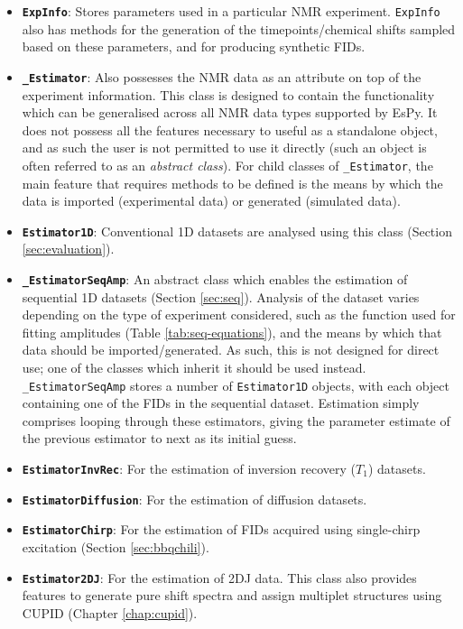 \begin{itemize}
    \item \textbf{\textbf{\texttt{ExpInfo}}}: Stores parameters used in a particular \ac{NMR}
        experiment. \texttt{ExpInfo} also has methods for the generation of the
        timepoints/chemical shifts sampled based on these parameters, and for
        producing synthetic \acp{FID}.
    \item \textbf{\texttt{\_Estimator}}: Also possesses the \ac{NMR} data as an
        attribute on top of the experiment information. This class is
        designed to contain the functionality which can be generalised across
        all \ac{NMR} data types supported by \ac{EsPy}. It does not
        possess all the features necessary to useful as a standalone object,
        and as such the user is not permitted to use it directly (such an
        object is often referred to as an \emph{abstract class}). For child
        classes of \texttt{\_Estimator}, the main feature that requires methods
        to be defined is the means by which the data is imported (experimental
        data) or generated (simulated data).
    \item \textbf{\texttt{Estimator1D}}: Conventional \ac{1D} datasets are
        analysed using this class (Section \ref{sec:evaluation}).
    \item \textbf{\texttt{\_EstimatorSeqAmp}}: An abstract class
        which enables the estimation of sequential \ac{1D} datasets
        (Section \ref{sec:seq}). Analysis of the dataset varies depending on
        the type of experiment considered, such as the function used for
        fitting amplitudes (Table \ref{tab:seq-equations}), and the means by
        which that data should be imported/generated. As such, this is not
        designed for direct use; one of the classes which inherit it should be
        used instead. \texttt{\_EstimatorSeqAmp} stores a number of
        \texttt{Estimator1D} objects, with each object containing one of the
        \acp{FID} in the sequential dataset. Estimation simply comprises
        looping through these estimators, giving the parameter estimate of the
        previous estimator to next as its initial guess.
    \item \textbf{\texttt{EstimatorInvRec}}: For the estimation of inversion
        recovery ($T_1$) datasets.
    \item \textbf{\texttt{EstimatorDiffusion}}: For the estimation of
        diffusion datasets.
    \item \textbf{\texttt{EstimatorChirp}}: For the estimation of \acp{FID}
        acquired using single-chirp excitation (Section \ref{sec:bbqchili}).
    \item \textbf{\texttt{Estimator2DJ}}: For the estimation of \ac{2DJ} data.
        This class also provides features to generate pure shift spectra and
        assign multiplet structures using \ac{CUPID} (Chapter
        \ref{chap:cupid}).
\end{itemize}

